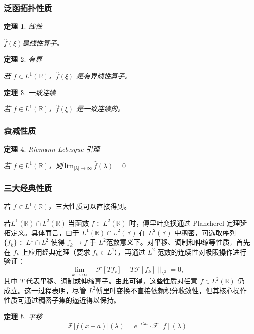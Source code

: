 \documentclass[12pt,a4paper]{article}
\theoremstyle{plain}
\newtheorem{theorem}{定理}[section]
\theoremstyle{definition}
\theoremstyle{remark}
\begin{document}
\subsubsection{泛函拓扑性质}
  \begin{theorem}线性
  	
\(\hat{f}(\xi)\)是线性算子。
\end{theorem}

\begin{theorem}有界
	
	若 \( f \in L^1(\mathbb{R}) \)，\(\hat{f}(\xi)\) 是有界线性算子。
\end{theorem}

\begin{theorem}一致连续
	
若 \( f \in L^1(\mathbb{R}) \)，\(\hat{f}(\xi)\) 是一致连续的。
\end{theorem}





\subsubsection{衰减性质}
 \begin{theorem}Riemann-Lebesgue 引理
 	
 若 \( f \in L^1(\mathbb{R}) \)，则$\lim_{|\lambda| \to \infty} \hat{f}(\lambda) = 0 $
 \end{theorem}
 


 \subsubsection{三大经典性质}
 若 \( f \in L^1(\mathbb{R}) \)，三大性质可以直接得到。
 
 若$ L^1(\mathbb{R}) \cap L^2(\mathbb{R})$
 当函数 \( f \in L^2(\mathbb{R}) \) 时，傅里叶变换通过 Plancherel 定理延拓定义。具体而言，由于 \( L^1(\mathbb{R}) \cap L^2(\mathbb{R}) \) 在 \( L^2(\mathbb{R}) \) 中稠密，可选取序列 \( \{f_k\} \subset L^1 \cap L^2 \) 使得 \( f_k \rightarrow f \) 于 \( L^2 \)范数意义下。对平移、调制和伸缩等性质，首先在 \( f_k \) 上应用经典定理（要求 \( f_k \in L^1 \)），再通过 \( L^2 \)-范数的连续性对极限操作进行验证：
 \[
 \lim_{k \rightarrow \infty} \| \mathcal{F}[T f_k] - T \mathcal{F}[f_k] \|_{L^2} = 0,
 \]
 其中 \( T \) 代表平移、调制或伸缩算子。由此可得，这些性质对任意 \( f \in L^2(\mathbb{R}) \) 仍成立。这一过程表明，尽管 \( L^2 \)傅里叶变换不直接依赖积分收敛性，但其核心操作性质可通过稠密子集的逼近得以保持。
  \begin{theorem}平移
 \[
 \mathcal{F}\big[f(x-a)\big](\lambda) = e^{-i\lambda a} \cdot \mathcal{F}[f](\lambda)
 \]
\end{theorem}
\end{document}
